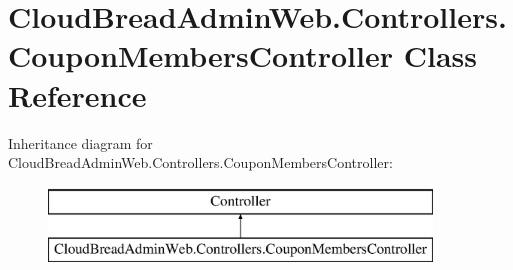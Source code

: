 \hypertarget{class_cloud_bread_admin_web_1_1_controllers_1_1_coupon_members_controller}{}\section{Cloud\+Bread\+Admin\+Web.\+Controllers.\+Coupon\+Members\+Controller Class Reference}
\label{class_cloud_bread_admin_web_1_1_controllers_1_1_coupon_members_controller}
Inheritance diagram for Cloud\+Bread\+Admin\+Web.\+Controllers.\+Coupon\+Members\+Controller\+:\begin{figure}[H]
\begin{center}
\leavevmode
\includegraphics[height=2.000000cm]{class_cloud_bread_admin_web_1_1_controllers_1_1_coupon_members_controller}
\end{center}
\end{figure}
